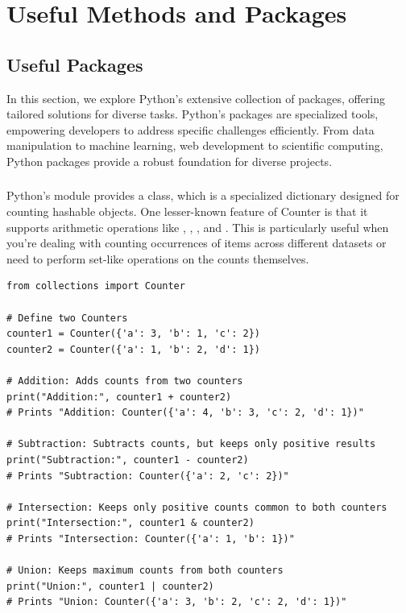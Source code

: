 \section{Useful Methods and Packages}


\subsection{Useful Packages}

In this section, we explore Python's extensive collection of packages, offering tailored solutions for diverse tasks. Python's packages are specialized tools, empowering developers to address specific challenges efficiently. From data manipulation to machine learning, web development to scientific computing, Python packages provide a robust foundation for diverse projects.




\subsubsection{}

Python's  module provides a  class, which is a specialized dictionary designed for counting hashable objects. One lesser-known feature of Counter is that it supports arithmetic operations like , , , and . This is particularly useful when you're dealing with counting occurrences of items across different datasets or need to perform set-like operations on the counts themselves.
\begin{lstlisting}
from collections import Counter

# Define two Counters
counter1 = Counter({'a': 3, 'b': 1, 'c': 2})
counter2 = Counter({'a': 1, 'b': 2, 'd': 1})

# Addition: Adds counts from two counters
print("Addition:", counter1 + counter2)
# Prints "Addition: Counter({'a': 4, 'b': 3, 'c': 2, 'd': 1})"

# Subtraction: Subtracts counts, but keeps only positive results
print("Subtraction:", counter1 - counter2)
# Prints "Subtraction: Counter({'a': 2, 'c': 2})"

# Intersection: Keeps only positive counts common to both counters
print("Intersection:", counter1 & counter2)
# Prints "Intersection: Counter({'a': 1, 'b': 1})"

# Union: Keeps maximum counts from both counters
print("Union:", counter1 | counter2)
# Prints "Union: Counter({'a': 3, 'b': 2, 'c': 2, 'd': 1})"
\end{lstlisting}

